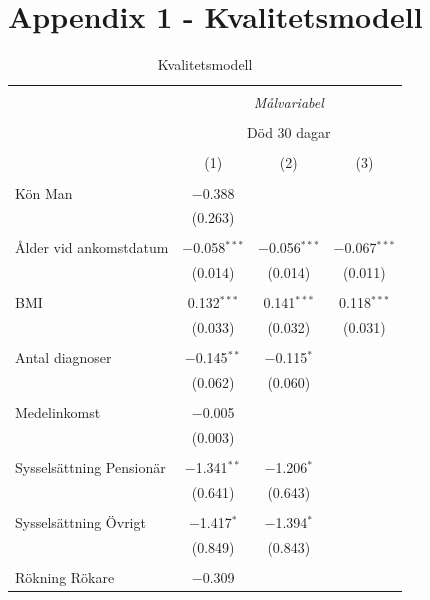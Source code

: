 {

\section{Appendix 1 - Kvalitetsmodell}

\begin{table}[!htbp] \centering
  \caption{Kvalitetsmodell} 
  \label{} 
\begin{tabular}{@{\extracolsep{5pt}}lccc} 
\\[-1.8ex]\hline 
\hline \\[-1.8ex] 
 & \multicolumn{3}{c}{\textit{Målvariabel}} \\ 
\cline{2-4} 
\\[-1.8ex] & \multicolumn{3}{c}{Död 30 dagar} \\ 
\\[-1.8ex] & (1) & (2) & (3)\\ 
\hline \\[-1.8ex] 
 Kön Man & $-$0.388 &  &  \\ 
  & (0.263) &  &  \\ 
  & & & \\ 
 Ålder vid ankomstdatum & $-$0.058$^{***}$ & $-$0.056$^{***}$ & $-$0.067$^{***}$ \\ 
  & (0.014) & (0.014) & (0.011) \\ 
  & & & \\ 
 BMI & 0.132$^{***}$ & 0.141$^{***}$ & 0.118$^{***}$ \\ 
  & (0.033) & (0.032) & (0.031) \\ 
  & & & \\ 
 Antal diagnoser & $-$0.145$^{**}$ & $-$0.115$^{*}$ &  \\ 
  & (0.062) & (0.060) &  \\ 
  & & & \\ 
 Medelinkomst & $-$0.005 &  &  \\ 
  & (0.003) &  &  \\ 
  & & & \\ 
 Sysselsättning Pensionär & $-$1.341$^{**}$ & $-$1.206$^{*}$ &  \\ 
  & (0.641) & (0.643) &  \\ 
  & & & \\ 
 Sysselsättning Övrigt & $-$1.417$^{*}$ & $-$1.394$^{*}$ &  \\ 
  & (0.849) & (0.843) &  \\ 
  & & & \\ 
 Rökning Rökare & $-$0.309 &  &  \\ 

\end{tabular}
\end{table}}
